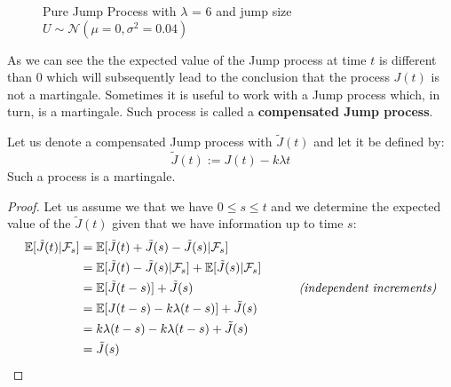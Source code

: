 \documentclass[times, utf8, diplomski]{fer}
\begin{document}
		\begin{figure}
		\centering
		\caption{Pure Jump Process with $\lambda$ = 6 and jump size $U \sim \mathcal{N}(\mu=0,\sigma^2=0.04)$}
		\label{fig:pure_jump_process}
		\end{figure}

		\noindent As we can see the the expected value of the Jump process at time $t$ is different than $0$ which will subsequently lead to the conclusion that the process $J(t)$ is not a martingale. Sometimes it is useful to work with a Jump process which, in turn, is a martingale. Such process is called a \textbf{compensated Jump process}. 
		
		\begin{proposition} Let us denote a compensated Jump process with $\tilde{J}(t)$ and let it be defined by:
			\begin{equation}
			\tilde{J}(t) := J(t) - k\lambda t
			\end{equation}
			Such a process is a martingale.
		\end{proposition}
		\begin{proof}
			Let us assume we that we have $0 \leq s \leq t$ and we determine the expected value of the $\tilde{J}(t)$ given that we have information up to time $s$:
			\begin{align*}
				\mathbb{E}[\tilde{J}(t)|\mathcal{F}_s] &= \mathbb{E}[\tilde{J}(t) + \tilde{J}(s) - \tilde{J}(s)|\mathcal{F}_s] \\
				&= \mathbb{E}[\tilde{J}(t) - \tilde{J}(s)|\mathcal{F}_s] + \mathbb{E}[\tilde{J}(s)|\mathcal{F}_s] \\
				&= \mathbb{E}[\tilde{J}(t - s)] + \tilde{J}(s) \hspace{3cm} \mbox{\textit{(independent increments)}} \\
				&= \mathbb{E}[J(t - s) - k\lambda (t-s)] + \tilde{J}(s)\\
				&= k\lambda (t-s) - k\lambda (t-s) + \tilde{J}(s) \\
				&= \tilde{J}(s)
			\end{align*}
		\end{proof}
\end{document}
